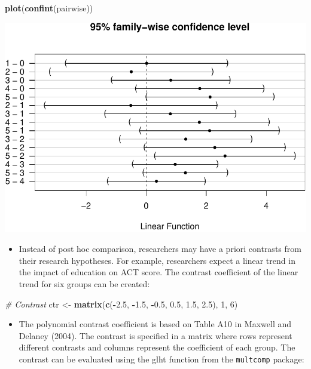 \documentclass[
]{book}
\newenvironment{Shaded}{\begin{snugshade}}{\end{snugshade}}
\newcommand{\CommentTok}[1]{\textcolor[rgb]{0.56,0.35,0.01}{\textit{#1}}}
\newcommand{\DecValTok}[1]{\textcolor[rgb]{0.00,0.00,0.81}{#1}}
\newcommand{\FloatTok}[1]{\textcolor[rgb]{0.00,0.00,0.81}{#1}}
\newcommand{\FunctionTok}[1]{\textcolor[rgb]{0.13,0.29,0.53}{\textbf{#1}}}
\newcommand{\NormalTok}[1]{#1}
\newcommand{\OtherTok}[1]{\textcolor[rgb]{0.56,0.35,0.01}{#1}}
\newcommand{\SpecialCharTok}[1]{\textcolor[rgb]{0.81,0.36,0.00}{\textbf{#1}}}
\providecommand{\tightlist}{%
  \setlength{\itemsep}{0pt}\setlength{\parskip}{0pt}}
\begin{document}
\begin{Shaded}
\begin{Highlighting}[]
\FunctionTok{plot}\NormalTok{(}\FunctionTok{confint}\NormalTok{(pairwise))}
\end{Highlighting}
\end{Shaded}

\includegraphics{PSY202A-Modeling-I.Heo_files/figure-latex/unnamed-chunk-99-1.pdf}

\begin{itemize}
\tightlist
\item
  Instead of post hoc comparison, researchers may have a priori contrasts from their research hypotheses. For example, researchers expect a linear trend in the impact of education on ACT score. The contrast coefficient of the linear trend for six groups can be created:
\end{itemize}

\begin{Shaded}
\begin{Highlighting}[]
\CommentTok{\# Contrast}
\NormalTok{ctr }\OtherTok{\textless{}{-}} \FunctionTok{matrix}\NormalTok{(}\FunctionTok{c}\NormalTok{(}\SpecialCharTok{{-}}\FloatTok{2.5}\NormalTok{, }\SpecialCharTok{{-}}\FloatTok{1.5}\NormalTok{, }\SpecialCharTok{{-}}\FloatTok{0.5}\NormalTok{, }\FloatTok{0.5}\NormalTok{, }\FloatTok{1.5}\NormalTok{, }\FloatTok{2.5}\NormalTok{), }\DecValTok{1}\NormalTok{, }\DecValTok{6}\NormalTok{)}
\end{Highlighting}
\end{Shaded}

\begin{itemize}
\tightlist
\item
  The polynomial contrast coefficient is based on Table A10 in Maxwell and Delaney (2004). The contrast is specified in a matrix where rows represent different contrasts and columns represent the coefficient of each group. The contrast can be evaluated using the glht function from the \texttt{multcomp} package:
\end{itemize}
\end{document}
